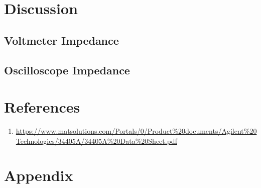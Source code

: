 \documentclass[a4paper,titlepage,10pt]{article}
\begin{document}
\section{Discussion}
\subsection{Voltmeter Impedance}

\subsection{Oscilloscope Impedance}


\section{References}
\begin{enumerate}
	\item \label{itm:34405A} \url{https://www.matsolutions.com/Portals/0/Product%20documents/Agilent%20Technologies/34405A/34405A%20Data%20Sheet.pdf}
\end{enumerate}

\section{Appendix}

\end{document}
